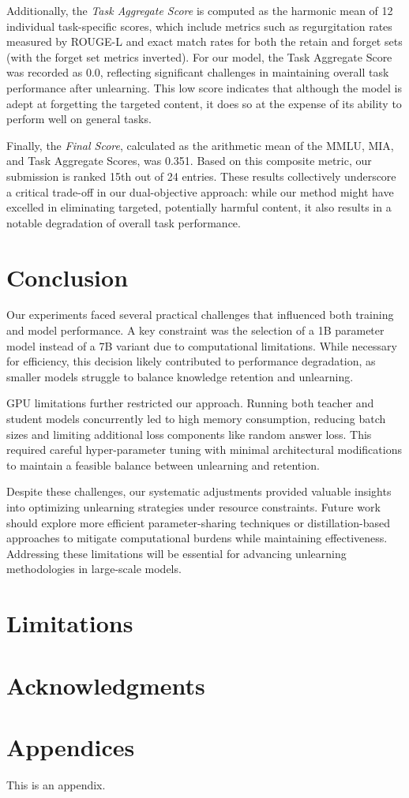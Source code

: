 \documentclass[11pt]{article}
\begin{document}
Additionally, the \textit{Task Aggregate Score} is computed as the harmonic mean of 12 individual task-specific scores, which include metrics such as regurgitation rates measured by ROUGE-L and exact match rates for both the retain and forget sets (with the forget set metrics inverted). For our model, the Task Aggregate Score was recorded as 0.0, reflecting significant challenges in maintaining overall task performance after unlearning. This low score indicates that although the model is adept at forgetting the targeted content, it does so at the expense of its ability to perform well on general tasks.

Finally, the \textit{Final Score}, calculated as the arithmetic mean of the MMLU, MIA, and Task Aggregate Scores, was 0.351. Based on this composite metric, our submission is ranked 15th out of 24 entries. These results collectively underscore a critical trade-off in our dual-objective approach: while our method might have excelled in eliminating targeted, potentially harmful content, it also results in a notable degradation of overall task performance.

\section*{Conclusion}

Our experiments faced several practical challenges that influenced both training and model performance. A key constraint was the selection of a 1B parameter model instead of a 7B variant due to computational limitations. While necessary for efficiency, this decision likely contributed to performance degradation, as smaller models struggle to balance knowledge retention and unlearning.  

GPU limitations further restricted our approach. Running both teacher and student models concurrently led to high memory consumption, reducing batch sizes and limiting additional loss components like random answer loss. This required careful hyper-parameter tuning with minimal architectural modifications to maintain a feasible balance between unlearning and retention.   

Despite these challenges, our systematic adjustments provided valuable insights into optimizing unlearning strategies under resource constraints. Future work should explore more efficient parameter-sharing techniques or distillation-based approaches to mitigate computational burdens while maintaining effectiveness. Addressing these limitations will be essential for advancing unlearning methodologies in large-scale models.  



\section*{Limitations}

\section*{Acknowledgments}





\appendix

\section{Appendices}

\label{sec:appendix}
This is an appendix.
\end{document}
